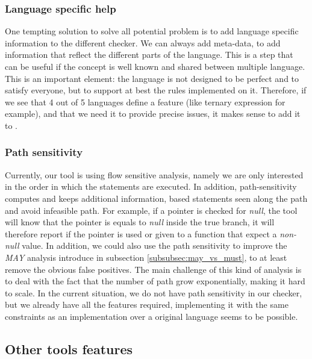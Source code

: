 \subsubsection{Language specific help}
\label{subsubsec:language_specific_help}

One tempting solution to solve all potential problem is to add language specific information to the different checker.
We can always add meta-data, to add information that reflect the different parts of the language. 
This is a step that can be useful if the concept is well known and shared between multiple language. 
This is an important element: the language is not designed to be perfect and to satisfy everyone, but to support at best the rules implemented on it. 
Therefore, if we see that 4 out of 5 languages define a feature (like ternary expression for example), and that we need it to provide precise issues, it makes sense to add it to \slang{}.


\subsubsection{Path sensitivity}
\label{subsubsec:path_sensitivity}

Currently, our tool is using flow sensitive analysis, namely we are only interested in the order in which the statements are executed. 
In addition, path-sensitivity computes and keeps additional information, based statements seen along the path and avoid infeasible path. 
For example, if a pointer is checked for \emph{null}, the tool will know that the pointer is equals to \emph{null} inside the true branch, it will therefore report if the pointer is used or given to a function that expect a \emph{non-null} value. 
In addition, we could also use the path sensitivity to improve the \emph{MAY} analysis introduce in subsection \ref{subsubsec:may_vs_must}, to at least remove the obvious false positives. 
The main challenge of this kind of analysis is to deal with the fact that the number of path grow exponentially, making it hard to scale. 
In the current situation, we do not have path sensitivity in our checker, but we already have all the features required, implementing it with the same constraints as an implementation over a original language seems to be possible.

\subsection{Other tools features}
\label{subsec:other_tools_features}

